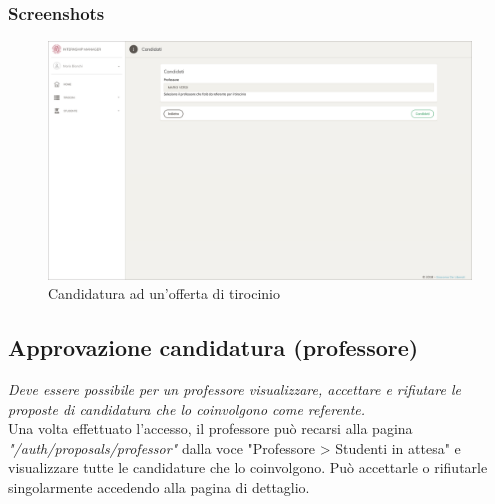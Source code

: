 \subsubsection{Screenshots}
\begin{figure}[H]
	\centering
	\includegraphics[width=1\textwidth]{Chapter3/Figs/screenshots/internshipcandidate}     
	\caption[Screenshot: candidatura ad un'offerta di tirocinio]{Candidatura ad un'offerta di tirocinio}
	\label{fig:screenshot:4}
\end{figure}

\pagebreak
\subsection{Approvazione candidatura (professore)}\label{sec:approvazione-candidatura-professore}

\textit{Deve essere possibile per un professore visualizzare, accettare e rifiutare le proposte di candidatura che lo coinvolgono come referente.} \\

\noindent
Una volta effettuato l'accesso, il professore può recarsi alla pagina \textit{"/auth/proposals/professor"} dalla voce "Professore > Studenti in attesa" e visualizzare tutte le candidature che lo coinvolgono. Può accettarle o rifiutarle singolarmente accedendo alla pagina di dettaglio.

